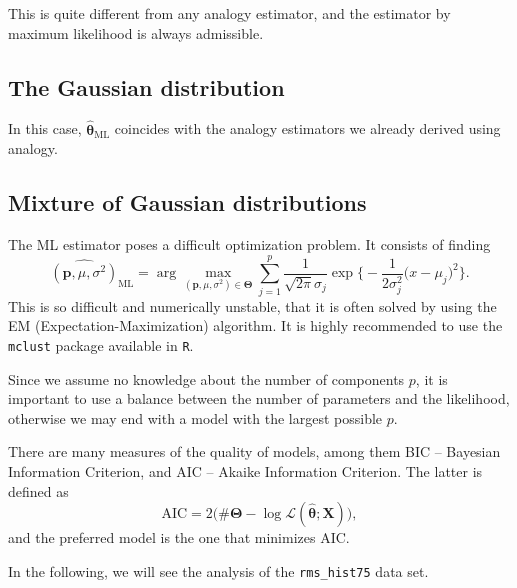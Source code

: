 This is quite different from any analogy estimator, and the estimator by maximum likelihood is always admissible.

\subsection{The Gaussian distribution}

In this case, $\widehat{\bm\theta}_{\text{ML}}$ coincides with the analogy estimators we already derived using analogy.

\subsection{Mixture of Gaussian distributions}

The ML estimator poses a difficult optimization problem.
It consists of finding
\begin{equation}
\widehat{(\bm p,\mu,\sigma^2)}_{\text{ML}} = \arg\max_{(\bm p,\mu,\sigma^2)\in\bm{\Theta}}
\sum_{j=1}^{p}
\frac{1}{\sqrt{2\pi}\sigma_j} \exp\Big\{
-\frac{1}{2\sigma_j^2} \big(x - \mu_j)^2 \Big\}.
\end{equation}
This is so difficult and numerically unstable, that it is often solved by using the EM (Expectation-Maximization) algorithm.
It is highly recommended to use the \texttt{mclust} package\cite{mclust4} available in \texttt{R}\cite{Rmanual}.

Since we assume no knowledge about the number of components $p$, it is important to use a balance between the number of parameters and the likelihood, otherwise we may end with a model with the largest possible $p$.

There are many measures of the quality of models, among them BIC -- Bayesian Information Criterion, and AIC -- Akaike Information Criterion.
The latter is defined as
$$
\text{AIC} = 2\big(\#\bm\Theta - \log \mathcal L(\widehat{\bm{\theta}};\bm X)\big),
$$
and the preferred model is the one that minimizes AIC.

In the following, we will see the analysis of the \verb|rms_hist75| data set.

